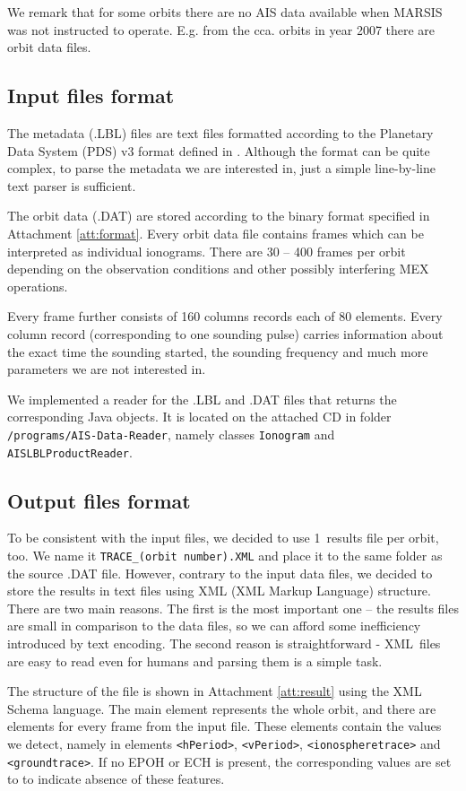 We remark that for some orbits there are no AIS data available when MARSIS was not instructed to operate. E.g. from the cca.  orbits in year 2007 there are  orbit data files.

\subsection{Input files format}
The metadata (.LBL) files are text files formatted according to the Planetary Data System (PDS) v3 format defined in \citep{JPL2009}. Although the format can be quite complex, to parse the metadata we are interested in, just a simple line-by-line text parser is sufficient.

The orbit data (.DAT) are stored according to the binary format specified in Attachment \ref{att:format}. Every orbit data file contains frames which can be interpreted as individual ionograms. There are 30 -- 400 frames per orbit depending on the observation conditions and other possibly interfering MEX operations. 

Every frame further consists of 160 columns records each of 80 elements. Every column record (corresponding to one sounding pulse) carries information about the exact time the sounding started, the sounding frequency and much more parameters we are not interested in.

We implemented a reader for the .LBL and .DAT files that re\-turns the corresponding Java objects. It is located on the attached CD in folder \texttt{/programs/AIS-Data-Reader}, namely classes \texttt{Ionogram} and \texttt{AISLBLProductReader}.

\subsection{Output files format}
To be consistent with the input files, we decided to use 1~results file per orbit, too. We name it \texttt{TRACE\_(orbit number).XML} and place it to the same folder as the source .DAT file. However, contrary to the input data files, we decided to store the results in text files using XML (XML Markup Language) structure. There are two main reasons. The first is the most important one -- the results files are small in comparison to the data files, so we can afford some inefficiency introduced by text encoding. The second reason is straightforward - XML~files are easy to read even for humans and parsing them is a simple task.

The structure of the file is shown in Attachment \ref{att:result} using the XML Schema language. The main element represents the whole orbit, and there are elements for every frame from the input file. These elements contain the values we detect, namely in elements \texttt{<hPeriod>}, \texttt{<vPeriod>}, \texttt{<ionospheretrace>} and \texttt{<groundtrace>}. If no EPOH or ECH is present, the corresponding values are set to  to indicate absence of these features.

